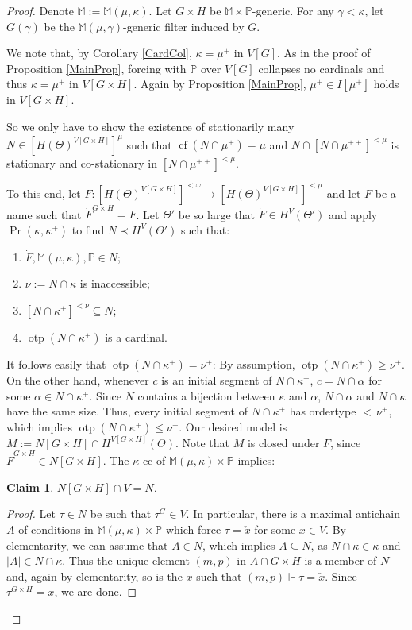 \documentclass[a4paper]{amsart}
\theoremstyle{definition}
\theoremstyle{remark}
\theoremstyle{plain}
\newtheorem*{myclaim}{Claim}
\numberwithin{mydef}{section}
\DeclareMathOperator{\otp}{otp}
\DeclareMathOperator{\cf}{cf}
\newcommand{\dM}{\mathbb{M}}
\newcommand{\dP}{\mathbb{P}}
\begin{document}
	\begin{proof}
		Denote $\dM:=\dM(\mu,\kappa)$. Let $G\times H$ be $\dM\times\dP$-generic. For any $\gamma<\kappa$, let $G(\gamma)$ be the $\dM(\mu,\gamma)$-generic filter induced by $G$.
		
		We note that, by Corollary \ref{CardCol}, $\kappa=\mu^+$ in $V[G]$. As in the proof of Proposition \ref{MainProp}, forcing with $\dP$ over $V[G]$ collapses no cardinals and thus $\kappa=\mu^+$ in $V[G\times H]$. Again by Proposition \ref{MainProp}, $\mu^+\in I[\mu^+]$ holds in $V[G\times H]$.
		
		So we only have to show the existence of stationarily many $N\in [H(\Theta)^{V[G\times H]}]^{\mu}$ such that $\cf(N\cap\mu^+)=\mu$ and $N\cap[N\cap\mu^{++}]^{<\mu}$ is stationary and co-stationary in $[N\cap\mu^{++}]^{<\mu}$.
		
		To this end, let $F\colon[H(\Theta)^{V[G\times H]}]^{<\omega}\to[H(\Theta)^{V[G\times H]}]^{<\mu}$ and let $\dot{F}$ be a name such that $\dot{F}^{G\times H}=F$. Let $\Theta'$ be so large that $\dot{F}\in H^V(\Theta')$ and apply $\Pr(\kappa,\kappa^+)$ to find $N\prec H^V(\Theta')$ such that:
		\begin{enumerate}
			\item $\dot{F},\dM(\mu,\kappa),\dP\in N$;
			\item $\nu:=N\cap\kappa$ is inaccessible;
			\item $[N\cap\kappa^+]^{<\nu}\subseteq N$;
			\item $\otp(N\cap\kappa^+)$ is a cardinal.
		\end{enumerate}
		It follows easily that $\otp(N\cap\kappa^+)=\nu^+$: By assumption, $\otp(N\cap\kappa^+)\geq\nu^+$. On the other hand, whenever $c$ is an initial segment of $N\cap\kappa^+$, $c=N\cap\alpha$ for some $\alpha\in N\cap\kappa^+$. Since $N$ contains a bijection between $\kappa$ and $\alpha$, $N\cap\alpha$ and $N\cap\kappa$ have the same size. Thus, every initial segment of $N\cap\kappa^+$ has ordertype ${<}\,\nu^+$, which implies $\otp(N\cap\kappa^+)\leq\nu^+$. Our desired model is $M:=N[G\times H]\cap H^{V[G\times H]}(\Theta)$. Note that $M$ is closed under $F$, since $\dot{F}^{G\times H}\in N[G\times H]$. The $\kappa$-cc of $\dM(\mu,\kappa)\times\dP$ implies:
		
		\begin{myclaim}
			$N[G\times H]\cap V=N$.
		\end{myclaim}
		
		\begin{proof}
			Let $\tau\in N$ be such that $\tau^G\in V$. In particular, there is a maximal antichain $A$ of conditions in $\dM(\mu,\kappa)\times\dP$ which force $\tau=\check{x}$ for some $x\in V$. By elementarity, we can assume that $A\in N$, which implies $A\subseteq N$, as $N\cap\kappa\in\kappa$ and $|A|\in N\cap\kappa$. Thus the unique element $(m,p)$ in $A\cap G\times H$ is a member of $N$ and, again by elementarity, so is the $x$ such that $(m,p)\Vdash\tau=\check{x}$. Since $\tau^{G\times H}=x$, we are done.
		\end{proof}
		

\end{proof}
\end{document}
